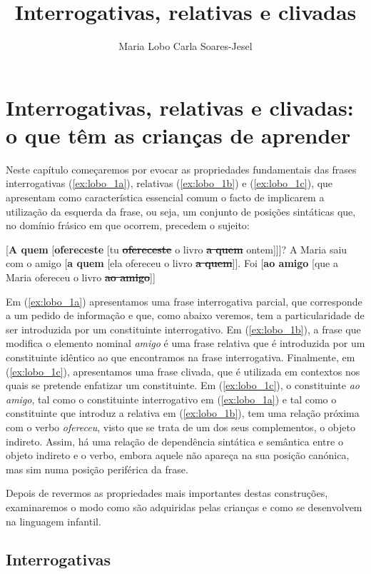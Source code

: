 \documentclass[output=paper]{LSP/langsci}
\author{Maria Lobo\affiliation{Centro de Linguística da Universidade Nova de Lisboa \& Faculdade de Ciências Sociais e Humanas, Universidade Nova de Lisboa}\lastand 
Carla Soares-Jesel\affiliation{Laboratoire de Linguistique Formelle - Université Paris Diderot}
}
\title{Interrogativas, relativas e clivadas}
\begin{document}
\section{Interrogativas, relativas e clivadas: o que têm as crianças de aprender} 
\label{sec:lobo_intro}

Neste capítulo começaremos por evocar as propriedades fundamentais das frases interrogativas (\ref{ex:lobo_1a}), relativas (\ref{ex:lobo_1b}) e  (\ref{ex:lobo_1c}), que apresentam como característica essencial comum o facto de implicarem a utilização da  esquerda da frase, ou seja, um conjunto de posições sintáticas que, no domínio frásico em que ocorrem, precedem o sujeito:

\ea\label{ex:lobo_1}
\ea\label{ex:lobo_1a} [\textbf{A quem} [\textbf{ofereceste} [tu \sout{\textbf{ofereceste}} o livro \sout{\textbf{a quem}} ontem]]]?
\ex\label{ex:lobo_1b} A Maria saiu com o amigo [\textbf{a quem} [ela ofereceu o livro \sout{\textbf{a quem}}]].
\ex\label{ex:lobo_1c} Foi [\textbf{ao amigo} [que a Maria ofereceu o livro \sout{\textbf{ao amigo}}]]
\zl

Em (\ref{ex:lobo_1a}) apresentamos uma frase interrogativa parcial, que corresponde a um pedido de informação e que, como abaixo veremos, tem a particularidade de ser introduzida por um constituinte interrogativo. Em (\ref{ex:lobo_1b}), a frase que modifica o elemento nominal \textit{amigo} é uma frase relativa que é introduzida por um constituinte idêntico ao que encontramos na frase interrogativa. Finalmente, em (\ref{ex:lobo_1c}), apresentamos uma frase clivada, que é utilizada em contextos nos quais se pretende enfatizar um constituinte. Em (\ref{ex:lobo_1c}), o constituinte \textit{ao amigo}, tal como o constituinte interrogativo em (\ref{ex:lobo_1a}) e tal como o constituinte que introduz a relativa em (\ref{ex:lobo_1b}), tem uma relação próxima com o verbo \textit{ofereceu}, visto que se trata de um dos seus complementos, o objeto indireto. Assim, há uma relação de dependência sintática e semântica entre o objeto indireto e o verbo, embora aquele não apareça na sua posição canónica, mas sim numa posição periférica da frase.

Depois de revermos as propriedades mais importantes destas construções, examinaremos o modo como são adquiridas pelas crianças e como se desenvolvem na linguagem infantil.

\subsection{Interrogativas}
\label{subsec:lobo_interrogativas}
\end{document}
